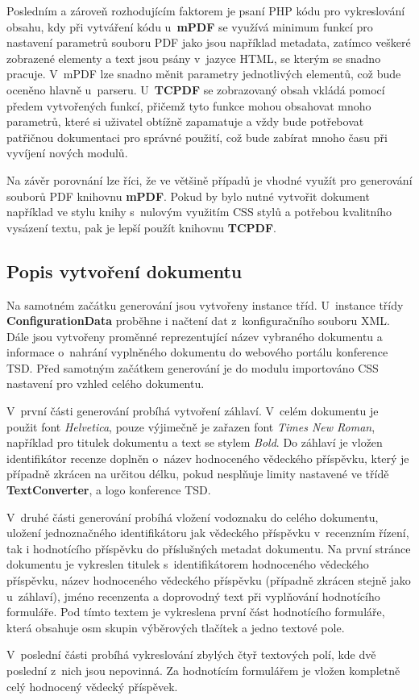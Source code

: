 \par
Posledním a zároveň rozhodujícím faktorem je psaní PHP kódu pro vykreslování obsahu, kdy při vytváření kódu u~\textbf{mPDF} se využívá minimum funkcí pro nastavení parametrů souboru PDF jako jsou například metadata, zatímco veškeré zobrazené elementy a text jsou psány v~jazyce HTML, se kterým se snadno pracuje. V~mPDF lze snadno měnit parametry jednotlivých elementů, což bude oceněno hlavně u~parseru. U~\textbf{TCPDF} se zobrazovaný obsah vkládá pomocí předem vytvořených funkcí, přičemž tyto funkce mohou obsahovat mnoho parametrů, které si uživatel obtížně zapamatuje a vždy bude potřebovat patřičnou dokumentaci pro správné použití, což bude zabírat mnoho času při vyvíjení nových modulů.
\par
Na závěr porovnání lze říci, že ve většině případů je vhodné využít pro generování souborů PDF knihovnu \textbf{mPDF}. Pokud by bylo nutné vytvořit dokument například ve stylu knihy s~nulovým využitím CSS stylů a potřebou kvalitního vysázení textu, pak je lepší použít knihovnu \textbf{TCPDF}. 

\subsection{Popis vytvoření dokumentu}
Na samotném začátku generování jsou vytvořeny instance tříd. U~instance třídy \textbf{ConfigurationData} proběhne i načtení dat z~konfiguračního souboru XML. Dále jsou vytvořeny proměnné reprezentující název vybraného dokumentu a informace o~nahrání vyplněného dokumentu do webového portálu konference TSD. Před samotným začátkem generování je do modulu importováno CSS nastavení pro vzhled celého dokumentu.
\par
V~první části generování probíhá vytvoření záhlaví. V~celém dokumentu je použit font \textit{Helvetica}, pouze výjimečně je zařazen font \textit{Times New Roman}, například pro titulek dokumentu a text se stylem \textit{Bold}. Do záhlaví je vložen identifikátor recenze doplněn o~název hodnoceného vědeckého příspěvku, který je případně zkrácen na určitou délku, pokud nesplňuje limity nastavené ve třídě \textbf{TextConverter}, a logo konference TSD. 
\par
V~druhé části generování probíhá vložení vodoznaku do celého dokumentu, uložení jednoznačného identifikátoru jak vědeckého příspěvku v~recenzním řízení, tak i hodnotícího příspěvku do příslušných metadat dokumentu. Na první stránce dokumentu je vykreslen titulek s~identifikátorem hodnoceného vědeckého příspěvku, název hodnoceného vědeckého příspěvku (případně zkrácen stejně jako u~záhlaví), jméno recenzenta a doprovodný text při vyplňování hodnotícího formuláře. Pod tímto textem je vykreslena první část hodnotícího formuláře, která obsahuje osm skupin výběrových tlačítek a jedno textové pole.
\par
V~poslední části probíhá vykreslování zbylých čtyř textových polí, kde dvě poslední z~nich jsou nepovinná. Za hodnotícím formulářem je vložen kompletně celý hodnocený vědecký příspěvek.
